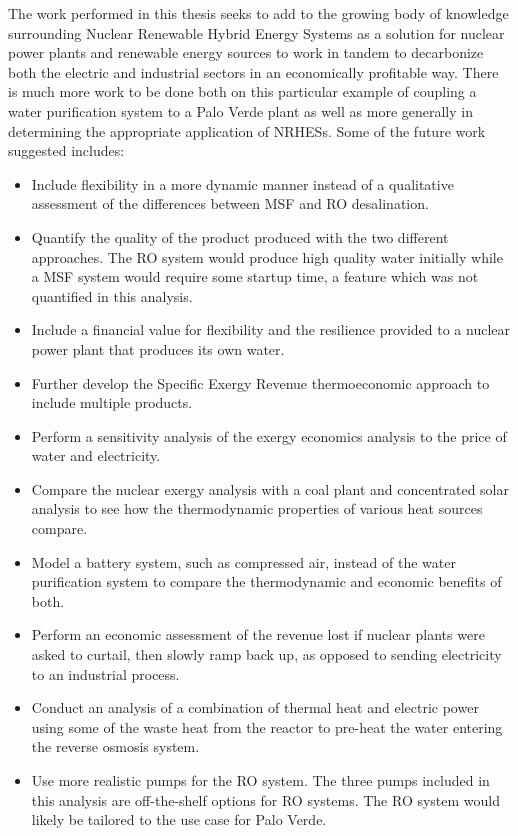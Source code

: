 
The work performed in this thesis seeks to add to the growing body of knowledge surrounding Nuclear Renewable Hybrid Energy Systems as a solution for nuclear power plants and renewable energy sources to work in tandem to decarbonize both the electric and industrial sectors in an economically profitable way. There is much more work to be done both on this particular example of coupling a water purification system to a Palo Verde plant as well as more generally in determining the appropriate application of NRHESs. Some of the future work suggested includes:

\begin{itemize}
\item Include flexibility in a more dynamic manner instead of a qualitative assessment of the differences between MSF and RO desalination.
\item Quantify the quality of the product produced with the two different approaches.  The RO system would produce high quality water initially while a MSF system would require some startup time, a feature which was not quantified in this analysis.
\item Include a financial value for flexibility and the resilience provided to a nuclear power plant that produces its own water.
\item Further develop the Specific Exergy Revenue thermoeconomic approach to include multiple products.
\item Perform a sensitivity analysis of the exergy economics analysis to the price of water and electricity.
\item Compare the nuclear exergy analysis with a coal plant and concentrated solar analysis to see how the thermodynamic properties of various heat sources compare.
\item Model a battery system, such as compressed air, instead of the water purification system to compare the thermodynamic and economic benefits of both.
\item Perform an economic assessment of the revenue lost if nuclear plants were asked to curtail, then slowly ramp back up, as opposed to sending electricity to an industrial process.
\item Conduct an analysis of a combination of thermal heat and electric power using some of the waste heat from the reactor to pre-heat the water entering the reverse osmosis system.
\item Use more realistic pumps for the RO system.  The three pumps included in this analysis are off-the-shelf options for RO systems.  The RO system would likely be tailored to the use case for Palo Verde.

\end{itemize}
